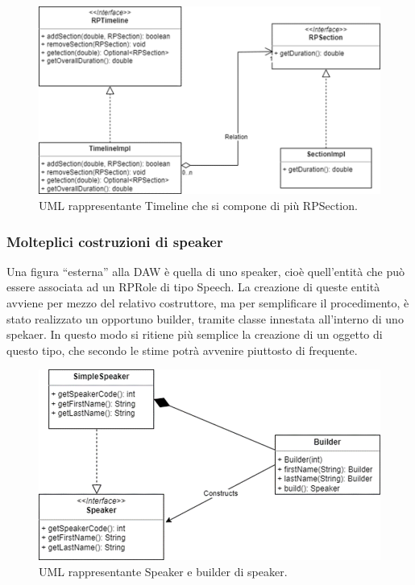 \documentclass[a4paper,12pt]{report}
\begin{document}
\begin{figure}[h]
\centering{}
\includegraphics[width=\textwidth,scale=1]{img/timeline.png}
\caption{UML rappresentante Timeline che si compone di più RPSection.}
\end{figure}

\subsubsection{Molteplici costruzioni di speaker}
Una figura “esterna” alla DAW è quella di uno speaker, cioè quell’entità che può essere associata ad un RPRole di tipo Speech. La creazione di queste entità avviene per mezzo del relativo costruttore, ma per semplificare il procedimento, è stato realizzato un opportuno builder, tramite classe innestata all’interno di uno spekaer. In questo modo si ritiene più semplice la creazione di un oggetto di questo tipo, che secondo le stime potrà avvenire piuttosto di frequente.

\begin{figure}[h]
\centering{}
\includegraphics[width=\textwidth,scale=1]{img/speaker.png}
\caption{UML rappresentante Speaker e builder di speaker.}
\end{figure}
\end{document}
